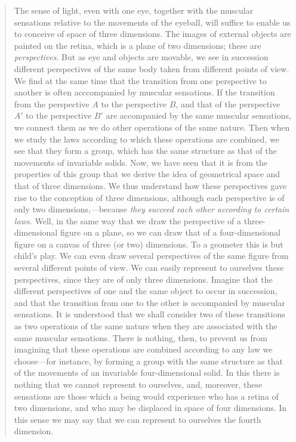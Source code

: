 \begin{quote}
    The sense of light, even with one eye, together with the muscular sensations relative to the movements of the eyeball, will suffice to enable us to conceive of space of three dimensions.  The images of external objects are painted on the retina, which is a plane of two dimensions; these are \emph{perspectives}.  But as eye and objects are movable, we see in succession different perspectives of the same body taken from different points of view.  We find at the same time that the transition from one perspective to another is often acccompanied by muscular sensations.  If the transition from the perspective $A$ to the perspective $B$, and that of the perspective $A'$ to the perspective $B'$ are accompanied by the same muscular sensations, we connect them as we do other operations of the same nature.  Then when we study the laws according to which these operations are combined, we see that they form a group, which has the same structure as that of the movements of invariable solids.  Now, we have seen that it is from the properties of this group that we derive the idea of geometrical space and that of three dimensions.  We thus understand how these perspectives gave rise to the conception of three dimensions, although each perspective is of only two dimensions,---because \emph{they succeed each other according to certain laws.}  Well, in the same way that we draw the perspective of a three-dimensional figure on a plane, so we can draw that of a four-dimensional figure on a canvas of three (or two) dimensions.  To a geometer this is but child's play.  We can even draw several perspectives of the same figure from several different points of view.  We can easily represent to ourselves these perspectives, since they are of only three dimensions.  Imagine that the different perspectives of one and the same object to occur in succession, and that the transition from one to the other is accompanied by muscular sensations.  It is understood that we shall consider two of these transitions as two operations of the same nature when they are associated with the same muscular sensations.  There is nothing, then, to prevent us from imagining that these operations are combined according to any law we choose---for instance, by forming a group with the same structure as that of the movements of an invariable four-dimensional solid.  In this there is nothing that we cannot represent to ourselves, and, moreover, these sensations are those which a being would experience who has a retina of two dimensions, and who may be displaced in space of four dimensions.  In this sense we may say that we can represent to ourselves the fourth dimension.  
    
    \citep[p. 68-70]{Poincare1952}
\end{quote}

